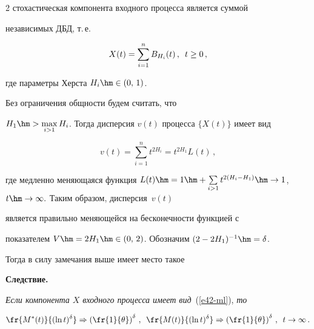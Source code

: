 \begin{multicols}{2}
стохастическая компонента входного процесса является суммой


независимых ДБД, т.\,е.\


\begin{equation}


X(t)=\sum\limits_{i=1}^n B_{H_i}(t)\,,\enskip t\ge 0\,,


\label{e42-ml}


\end{equation}


где параметры Херста $H_i\hm\in (0,\,1)$.


 Без ограничения общности будем считать, что


$H_1\hm>\max\limits_{i>1}H_i$. Тогда  дисперсия $v(t)$  процесса $\{X(t)\}$  имеет вид


$$


v(t)=\sum\limits_{i=1}^n t^{2H_i}=t^{2H_1}L(t)\,,


$$


где медленно меняющаяся функция $ L(t)\hm=1\hm+\sum\limits_{i>1}


t^{2(H_i-H_1)}\hm\to 1$, $t \hm\to \infty. $ Таким образом,  дисперсия~$v(t)$ 


является правильно меняющейся на бесконечности функцией с


показателем $V\hm=2H_1\hm\in (0,\,2)$. Обозначим $ (2-2H_1)^{-1}\hm=\delta$.


Тогда в силу замечания выше имеет место такое





\smallskip





\noindent


\textbf{Следствие.}


\textit{Если компонента $X$  входного процесса имеет вид}~(\ref{e42-ml}), \textit{то}


$$


\fr{M^*(t)}{(\ln t)^\delta} \Rightarrow


\left(\fr{1}{\theta}\right)^{\delta}\,,\enskip \fr{M(t)}{(\ln


t)^\delta} \Rightarrow


\left(\fr{1}{\theta}\right)^\delta\,,\enskip t \to \infty\,.


$$





\smallskip






\end{multicols}
